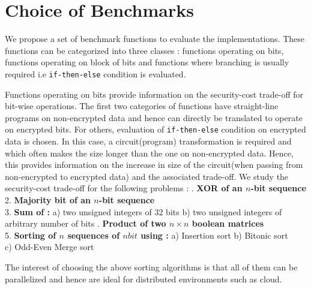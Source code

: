 \documentclass{acm_proc_article-sp}
\begin{document}
\section{Choice of Benchmarks}
\label{sec:bm}

We propose a set of benchmark functions to evaluate the implementations. These functions can be categorized into three classes : functions operating on bits, functions operating on block of bits and functions where branching is usually required i.e \texttt{if-then-else} condition is evaluated.

Functions operating on bits provide information on the security-cost trade-off for bit-wise operations. The first two categories of functions have straight-line programs on non-encrypted data and hence can directly be translated to operate on encrypted bits. For others, evaluation of \texttt{if-then-else} condition on encrypted data is chosen. In this case, a circuit(program) transformation is required and which often makes the size longer than the one on non-encrypted data. Hence, this provides information on the increase in size of the circuit(when passing from non-encrypted to encrypted data) and the associated trade-off. We study the security-cost trade-off for the following problems : . \textbf{XOR of an $n$-bit sequence}\\
2. \textbf{Majority bit of an $n$-bit sequence} \\
3. \textbf{Sum of :}  a) two unsigned integers of $32$ bits  \newline 
\phantom{x}\hspace{12ex} b) two unsigned integers of arbitrary  \newline \phantom{x}\hspace{15ex} number of bits  . \textbf{Product of two $n\times n$ boolean matrices} \\
5. \textbf{Sorting of $n$ sequences of $nbit$ using :} \newline\noindent
\phantom{x}\hspace{3ex} a) Insertion sort \phantom{x}\hspace{2ex} b) Bitonic sort \\
	\phantom{x}\hspace{3ex} 	     c) Odd-Even Merge sort 

The interest of choosing the above sorting algorithms is that all of them can be parallelized and hence are ideal for distributed environments such as cloud. 
\end{document}
